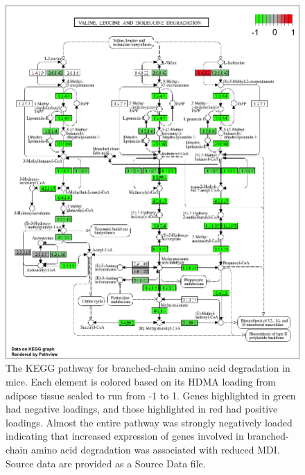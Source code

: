 \documentclass[
]{article}
\begin{document}
\begin{figure}[ht!]
\includegraphics[width=\textwidth]{Figures/Supp_Fig_Branched_Chain.png} 
\caption{The KEGG pathway for branched-chain amino acid degradation in 
mice. Each element is colored based on its HDMA loading from adipose
tissue scaled to run from -1 to 1. Genes highlighted in green had 
negative loadings, and those highlighted in red had positive loadings. 
Almost the entire pathway was strongly negatively loaded indicating 
that increased expression of genes involved in branched-chain amino acid 
degradation was associated with reduced MDI. Source data are provided as 
a Source Data file.
}
\label{fig:bcaa_degrataion}
\end{figure}
\end{document}
